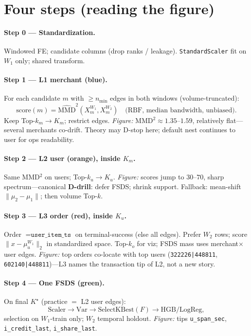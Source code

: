\documentclass[11pt]{article}
\begin{document}
\section{Four steps (reading the figure)}

\paragraph{Step 0 --- Standardization.}
Windowed FE; candidate columns (drop ranks / leakage).
\texttt{StandardScaler} fit on $W_1$ only; shared transform.

\paragraph{Step 1 --- L1 merchant (blue).}
For each candidate $m$ with $\ge n_{\min}$ edges in both windows
(volume-truncated):
\[
  \mathrm{score}(m)
  =\widehat{\mathrm{MMD}}^2(X_m^{W_1},X_m^{W_2})
  \quad\text{(RBF, median bandwidth, unbiased)}.
\]
Keep Top-$k_m\to K_m$; restrict edges.
\emph{Figure:} MMD$^2\approx 1.35$--$1.59$, relatively flat---several
merchants co-drift. Theory may D-stop here; default nest continues to
user for ops readability.

\paragraph{Step 2 --- L2 user (orange), inside $K_m$.}
Same MMD$^2$ on users; Top-$k_u\to K_u$.
\emph{Figure:} scores jump to $30$--$70$, sharp spectrum---canonical
\textbf{D-drill}: defer FSDS; shrink support.
Fallback: mean-shift $\| \mu_2-\mu_1\|$; then volume Top-$k$.

\paragraph{Step 3 --- L3 order (red), inside $K_u$.}
Order $=\texttt{user\_item\_ts}$ on terminal-success (else all edges).
Prefer $W_2$ rows; score $\|x-\mu_u^{W_1}\|_2$ in standardized space.
Top-$k_o$ for viz; FSDS mass uses merchant$\times$user edges.
\emph{Figure:} top orders co-locate with top users
(\texttt{322226|448811}, \texttt{602140|448811})---L3 names the
transaction tip of L2, not a new story.

\paragraph{Step 4 --- One FSDS (green).}
On final $K^\star$ (practice $=$ L2 user edges):
\[
  \mathrm{Scaler}\to\mathrm{Var}\to\mathrm{SelectKBest}(F)
  \to\mathrm{HGB}/\mathrm{LogReg},
\]
selection on $W_1$-train only; $W_2$ temporal holdout.
\emph{Figure:} tips
\texttt{u\_span\_sec}, \texttt{i\_credit\_last}, \texttt{i\_share\_last}.
\end{document}
